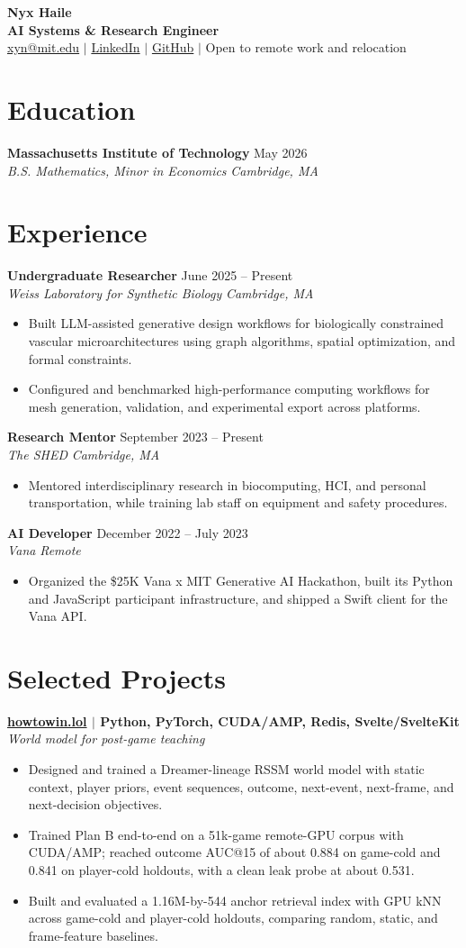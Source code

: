 \documentclass[letterpaper,11pt]{article}
\newcommand{\resumeItem}[1]{\item\small{#1}}
\newcommand{\resumeSubheading}[4]{%
  \vspace{1pt}\textbf{#1} \hfill #2\\
  {\small\textit{#3}} \hfill {\small\textit{#4}}\\[-5pt]
}
\newcommand{\resumeProject}[2]{%
  \vspace{1pt}\textbf{#1} \hfill {\small\textit{#2}}\\[-5pt]
}
\newcommand{\resumeListStart}{\begin{itemize}[label={-},leftmargin=0.18in,itemsep=1pt,topsep=2pt,parsep=0pt,partopsep=0pt]}
\newcommand{\resumeListEnd}{\end{itemize}\vspace{-2pt}}
\begin{document}
\begin{center}
  {\LARGE\bfseries Nyx Haile}\\[2pt]
  {\large\bfseries AI Systems \& Research Engineer}\\[3pt]
  \small \href{mailto:xyn@mit.edu}{xyn@mit.edu} $\mid$
  \href{https://www.linkedin.com/in/nyx-haile-bb6711228}{LinkedIn} $\mid$
  \href{https://github.com/nyx-haile}{GitHub} $\mid$
  Open to remote work and relocation
\end{center}

\section{Education}
\resumeSubheading{Massachusetts Institute of Technology}{May 2026}{B.S. Mathematics, Minor in Economics}{Cambridge, MA}

\section{Experience}
\resumeSubheading{Undergraduate Researcher}{June 2025 -- Present}{Weiss Laboratory for Synthetic Biology}{Cambridge, MA}
\resumeListStart
  \resumeItem{Built LLM-assisted generative design workflows for biologically constrained vascular microarchitectures using graph algorithms, spatial optimization, and formal constraints.}
  \resumeItem{Configured and benchmarked high-performance computing workflows for mesh generation, validation, and experimental export across platforms.}
\resumeListEnd

\resumeSubheading{Research Mentor}{September 2023 -- Present}{The SHED}{Cambridge, MA}
\resumeListStart
  \resumeItem{Mentored interdisciplinary research in biocomputing, HCI, and personal transportation, while training lab staff on equipment and safety procedures.}
\resumeListEnd

\resumeSubheading{AI Developer}{December 2022 -- July 2023}{Vana}{Remote}
\resumeListStart
  \resumeItem{Organized the \$25K Vana x MIT Generative AI Hackathon, built its Python and JavaScript participant infrastructure, and shipped a Swift client for the Vana API.}
\resumeListEnd

\section{Selected Projects}
\resumeProject{\href{https://github.com/nyx-haile/howtowin.lol}{howtowin.lol} $\mid$ Python, PyTorch, CUDA/AMP, Redis, Svelte/SvelteKit}{World model for post-game teaching}
\resumeListStart
  \resumeItem{Designed and trained a Dreamer-lineage RSSM world model with static context, player priors, event sequences, outcome, next-event, next-frame, and next-decision objectives.}
  \resumeItem{Trained Plan B end-to-end on a 51k-game remote-GPU corpus with CUDA/AMP; reached outcome AUC@15 of about 0.884 on game-cold and 0.841 on player-cold holdouts, with a clean leak probe at about 0.531.}
  \resumeItem{Built and evaluated a 1.16M-by-544 anchor retrieval index with GPU kNN across game-cold and player-cold holdouts, comparing random, static, and frame-feature baselines.}
\resumeListEnd
\end{document}
